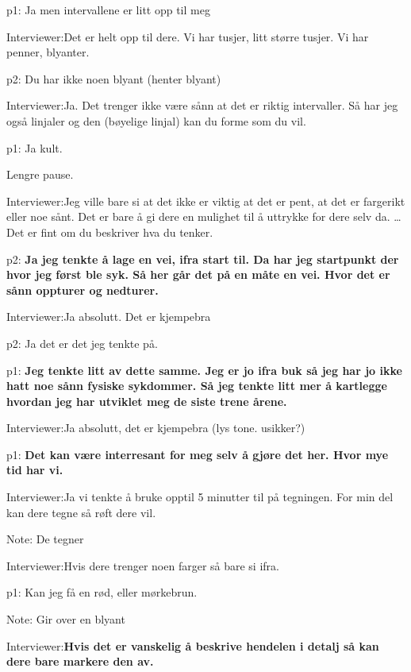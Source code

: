 \documentclass[11pt, norsk, a4paper]{article}
\begin{document}
\textcolor{myGreen} {p1:} Ja men intervallene er litt opp til meg

\textcolor{myBlue} {Interviewer:}Det er helt opp til dere. Vi har tusjer, litt større tusjer. Vi har penner, blyanter.

\textcolor{myYellow} {p2:} Du har ikke noen blyant (henter blyant)

\textcolor{myBlue} {Interviewer:}Ja. Det trenger ikke være sånn at det er riktig intervaller. Så har jeg også linjaler og den (bøyelige linjal) kan du forme som du vil.

\textcolor{myGreen} {p1:} Ja kult.

Lengre pause. 

\textcolor{myBlue} {Interviewer:}Jeg ville bare si at det ikke er viktig at det er pent, at det er fargerikt eller noe sånt. Det er bare å gi dere en mulighet til å uttrykke for dere selv da. \dots Det er fint om du beskriver hva du tenker.

\textcolor{myYellow} {p2:} \textbf{Ja jeg tenkte å lage en vei, ifra start til. Da har jeg startpunkt der hvor jeg først ble syk. Så her går det på en måte en vei. Hvor det er sånn oppturer og nedturer.}

\textcolor{myBlue} {Interviewer:}Ja absolutt. Det er kjempebra

\textcolor{myYellow} {p2:} Ja det er det jeg tenkte på.

\textcolor{myGreen} {p1:} \textbf{Jeg tenkte litt av dette samme. Jeg er jo ifra buk så jeg har jo ikke hatt noe sånn fysiske sykdommer. Så jeg tenkte litt mer å kartlegge hvordan jeg har utviklet meg de siste trene årene.}

\textcolor{myBlue} {Interviewer:}Ja absolutt, det er kjempebra (lys tone. usikker?)

\textcolor{myGreen} {p1:} \textbf{Det kan være interresant for meg selv å gjøre det her. Hvor mye tid har vi. }

\textcolor{myBlue} {Interviewer:}Ja vi tenkte å bruke opptil 5 minutter til på tegningen. For min del kan dere tegne så røft dere vil. 


\textcolor{myGrey}{Note:} De tegner

\textcolor{myBlue} {Interviewer:}Hvis dere trenger noen farger så bare si ifra.

\textcolor{myGreen} {p1:} Kan jeg få en rød, eller mørkebrun.

\textcolor{myGrey}{Note:} Gir over en blyant

\textcolor{myBlue} {Interviewer:}\textbf{Hvis det er vanskelig å beskrive hendelen i detalj så kan dere bare markere den av.} 
\end{document}
